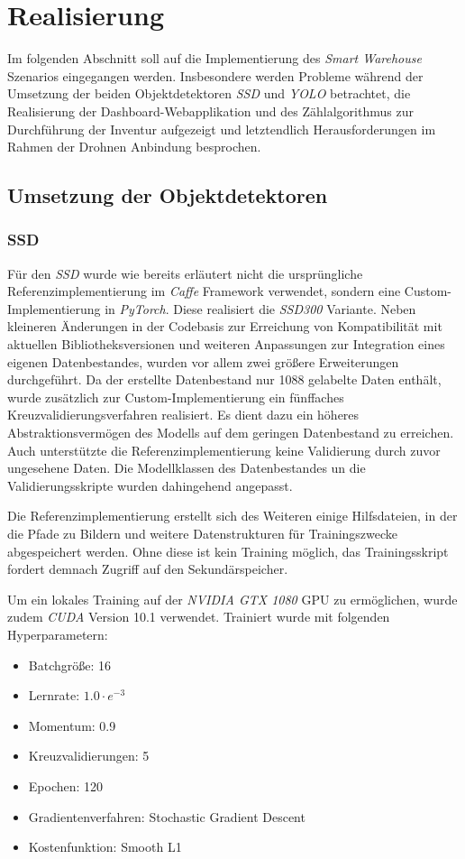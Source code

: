 \chapter{Realisierung}

Im folgenden Abschnitt soll auf die Implementierung des \textit{Smart Warehouse} Szenarios eingegangen werden. Insbesondere werden Probleme während der Umsetzung der beiden Objektdetektoren \textit{SSD} und \textit{YOLO} betrachtet, die Realisierung der Dashboard-Webapplikation und des Zählalgorithmus zur Durchführung der Inventur aufgezeigt und letztendlich Herausforderungen im Rahmen der Drohnen Anbindung besprochen.

\section{Umsetzung der Objektdetektoren}

\subsection*{SSD}

Für den \textit{SSD} wurde wie bereits erläutert nicht die ursprüngliche Referenzimplementierung im \textit{Caffe} Framework verwendet, sondern eine Custom-Implementierung in \textit{PyTorch}. Diese realisiert die \textit{SSD300} Variante. Neben kleineren Änderungen in der Codebasis zur Erreichung von Kompatibilität mit aktuellen Bibliotheksversionen und weiteren Anpassungen zur Integration eines eigenen Datenbestandes, wurden vor allem zwei größere Erweiterungen durchgeführt. Da der erstellte Datenbestand nur 1088 gelabelte Daten enthält, wurde zusätzlich zur Custom-Implementierung ein fünffaches Kreuzvalidierungsverfahren realisiert. Es dient dazu ein höheres Abstraktionsvermögen des Modells auf dem geringen Datenbestand zu erreichen. Auch unterstützte die Referenzimplementierung keine Validierung durch zuvor ungesehene Daten. Die Modellklassen des Datenbestandes un die Validierungsskripte wurden dahingehend angepasst.

Die Referenzimplementierung erstellt sich des Weiteren einige Hilfsdateien, in der die Pfade zu Bildern und weitere Datenstrukturen für Trainingszwecke abgespeichert werden. Ohne diese ist kein Training möglich, das Trainingsskript fordert demnach Zugriff auf den Sekundärspeicher. 

Um ein lokales Training auf der \textit{NVIDIA GTX 1080} GPU zu ermöglichen, wurde zudem \textit{CUDA} Version 10.1 verwendet. Trainiert wurde mit folgenden Hyperparametern:
\begin{itemize}
	\item Batchgröße: 16
	\item Lernrate: $1.0\cdot e^{-3}$
	\item Momentum: 0.9
	\item Kreuzvalidierungen: 5
	\item Epochen: 120
	\item Gradientenverfahren: Stochastic Gradient Descent
	\item Kostenfunktion: Smooth L1
\end{itemize}

